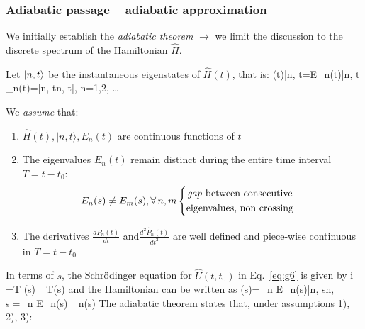 \documentclass[12pt]{article}
\begin{document}
\subsubsection{Adiabatic passage -- adiabatic approximation}

We initially establish the \emph{adiabatic theorem}
$\rightarrow$ we limit the discussion to the discrete
spectrum of the Hamiltonian $\hat{H}$.

Let $\ket{n,t}$ be the instantaneous eigenstates of
$\hat{H}(t)$, that is:
\be
{}(t)|n, t\rangle=E_{n}(t)|n, t\rangle
\ee
%
\be
{}_{n}(t)=|n, t\rangle\langle n, t|, n=1,2, \ldots
\ee


We \emph{assume} that:
\begin{enumerate}
\item $\hat{H}(t),|n, t\rangle, E_{n}(t)$ are continuous functions of $t$
%
\item The eigenvalues $E_{n}(t)$ remain distinct
during the entire time interval $T=t-t_{0}$:
\[
E_{n}(s) \neq E_{m}(s), \forall\, n, m
\begin{cases}
\begin{gathered}
\text{\emph{gap} between consecutive}\\
\text{eigenvalues, non crossing}
\end{gathered}
\end{cases}
\]
%
\item The derivatives $\frac{d\hat{P}_n(t)}{dt}$ and$ \frac{d^2\hat{P}_n(t)}{dt^2}$ are well
defined and piece-wise continuous in $T=t-t_0$
\end{enumerate}
%
In terms of $s$, the Schrödinger equation
for $\hat{U}\left(t, t_{0}\right)$ in Eq.~\eqref{eq:g6} is given by
\be
i \hbar {}=T (s) _{T}(s)
\label{eq:g20}
\ee
and the Hamiltonian can be written as
\be
{}(s)=\sum_{n} E_{n}(s)|n, s\rangle\langle n, s|=\sum_{n} E_{n}(s) _{n}(s)
\ee
The adiabatic theorem states that, under assumptions 1), 2), 3):
\be
{}
\ee

\enlargethispage{\baselineskip}
\end{document}
